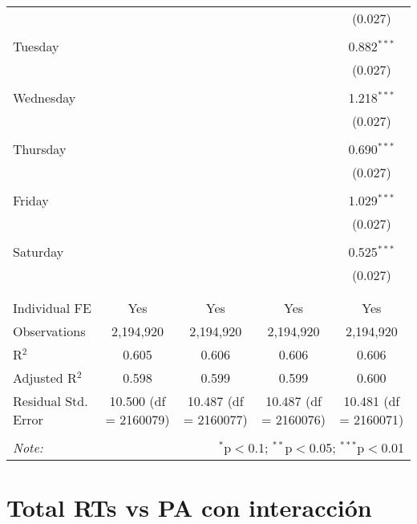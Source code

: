 \documentclass[
]{article}
\begin{document}
\begin{table}[!htbp]
{\begin{tabular}{@{\extracolsep{5pt}}lcccc}
  &  &  &  & (0.027) \\ 
  & & & & \\ 
 Tuesday &  &  &  & 0.882$^{***}$ \\ 
  &  &  &  & (0.027) \\ 
  & & & & \\ 
 Wednesday &  &  &  & 1.218$^{***}$ \\ 
  &  &  &  & (0.027) \\ 
  & & & & \\ 
 Thursday &  &  &  & 0.690$^{***}$ \\ 
  &  &  &  & (0.027) \\ 
  & & & & \\ 
 Friday &  &  &  & 1.029$^{***}$ \\ 
  &  &  &  & (0.027) \\ 
  & & & & \\ 
 Saturday &  &  &  & 0.525$^{***}$ \\ 
  &  &  &  & (0.027) \\ 
  & & & & \\ 
\hline \\[-1.8ex] 
Individual FE & Yes & Yes & Yes & Yes \\ 
Observations & 2,194,920 & 2,194,920 & 2,194,920 & 2,194,920 \\ 
R$^{2}$ & 0.605 & 0.606 & 0.606 & 0.606 \\ 
Adjusted R$^{2}$ & 0.598 & 0.599 & 0.599 & 0.600 \\ 
Residual Std. Error & 10.500 (df = 2160079) & 10.487 (df = 2160077) & 10.487 (df = 2160076) & 10.481 (df = 2160071) \\ 
\hline 
\hline \\[-1.8ex] 
\textit{Note:}  & \multicolumn{4}{r}{$^{*}$p$<$0.1; $^{**}$p$<$0.05; $^{***}$p$<$0.01} \\ 
\end{tabular}
} 
\end{table} 
\newpage
\section{Total RTs vs PA con interacción}
\end{document}
